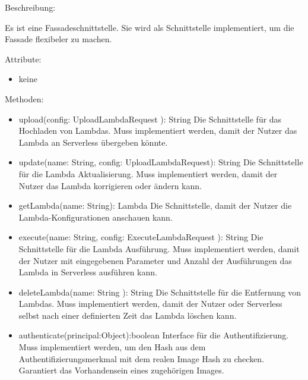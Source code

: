 \documentclass[a4paper,20pt,oneside]{book}
\begin{document}
	\vspace{0.5cm}
	\raggedright
	
	Beschreibung:
	
	Es ist eine Fassadeschnittstelle. Sie wird als Schnittstelle implementiert, um die Fassade flexibeler zu machen.
	
	\vspace{0.5cm}
	Attribute:
	\begin{itemize}
	\item keine
	
	\end{itemize}
	
	Methoden:
	\begin{itemize}
	\item  upload(config: UploadLambdaRequest ): String\linebreak
	Die Schnittstelle für das Hochladen von Lambdas. Muss 					implementiert werden, damit der Nutzer das Lambda an 			Serverless übergeben könnte.	
	
	\item update(name: String, config: UploadLambdaRequest): String \linebreak
	Die Schnittstelle für die Lambda Aktualisierung. Muss 			implementiert werden, damit der Nutzer das Lambda 				korrigieren oder ändern kann.
	
	\item getLambda(name: String): Lambda\linebreak
	Die Schnittstelle, damit der Nutzer die Lambda-Konfigurationen anschauen kann.
	
	\item execute(name: String, config: ExecuteLambdaRequest  ): String\linebreak
	Die Schnittstelle für die Lambda Ausführung. Muss 			implementiert werden, damit der Nutzer mit eingegebenen Parameter und Anzahl der Ausführungen das Lambda in Serverless ausführen kann. 
	\item deleteLambda(name: String ): String\linebreak
	Die Schnittstelle für die Entfernung von Lambdas. Muss 			implementiert werden, damit der Nutzer oder Serverless selbst nach einer definierten Zeit das Lambda löschen kann. 
	\item authenticate(principal:Object):boolean\linebreak
	Interface für die Authentifizierung. Muss implementiert werden, um den Hash aus dem Authentifizierungsmerkmal mit dem realen Image Hash zu checken. Garantiert das Vorhandensein eines zugehörigen Images. 	
	
	\end{itemize}
\end{document}
